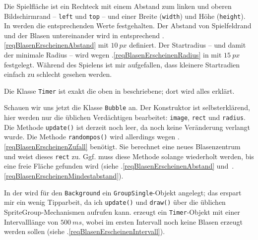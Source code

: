 Die Spielfläche ist ein Rechteck mit einem Abstand zum linken und oberen Bildschirmrand -- \texttt{left} und \texttt{top} -- und einer Breite (\texttt{width}) und Höhe (\texttt{height}). In  werden die entsprechenden Werte festgehalten. Der Abstand von Spielfeldrand und der Blasen untereinander wird in  entsprechend .\ref{reqBlasenErscheinenAbstand} mit $10~px$ definiert. Der Startradius -- und damit der minimale Radius -- wird wegen .\ref{reqBlasenErscheinenRadius} in  mit $15~px$ festgelegt. Während des Spielens ist mir aufgefallen, dass kleinere Startradien einfach zu schlecht gesehen werden.


Die Klasse \texttt{Timer} ist exakt die oben in  beschriebene; dort wird alles erklärt.


Schauen wir uns jetzt die Klasse \texttt{Bubble} an. Der Konstruktor ist selbsterklärend, hier werden nur die üblichen Verdächtigen bearbeitet: \texttt{image}, \texttt{rect} und \texttt{radius}. Die Methode \texttt{update()} ist derzeit noch leer, da noch keine Veränderung verlangt wurde. Die Methode \texttt{randompos()} wird allerdings wegen .\ref{reqBlasenErscheinenZufall} benötigt. Sie berechnet eine neues Blasenzentrum und weist dieses \texttt{rect} zu. Ggf. muss diese Methode solange wiederholt werden, bis eine freie Fläche gefunden wird (siehe .\ref{reqBlasenErscheinenAbstand} und~.\ref{reqBlasenErscheinenMindestabstand}).


In der  wird für den \texttt{Background} ein \texttt{GroupSingle}-Objekt angelegt; das erspart mir ein wenig Tipparbeit, da ich \texttt{update()} und \texttt{draw()} über die üblichen SpriteGroup-Mechanismen aufrufen kann.  erzeugt ein \texttt{Timer}-Objekt mit einer Intervalllänge von $500~ms$, wobei im ersten Intervall noch keine Blasen erzeugt werden sollen (siehe .\ref{reqBlasenErscheinenIntervall}).

